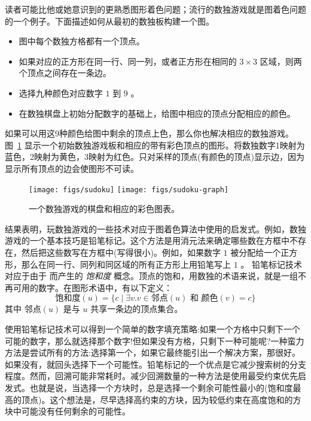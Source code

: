 \documentclass[11pt]{book}
\begin{document}
读者可能比他或她意识到的更熟悉图形着色问题；流行的数独游戏就是图着色问题的一个例子。下面描述如何从最初的数独板构建一个图。
\begin{itemize}
\item 图中每个数独方格都有一个顶点。
\item 如果对应的正方形在同一行、同一列，或者正方形在相同的 $3\times 3$ 区域，则两个顶点之间存在一条边。
\item 选择九种颜色对应数字 $1$ 到 $9$ 。
\item 在数独棋盘上初始分配数字的基础上，给图中相应的顶点分配相应的颜色。
\end{itemize}
如果可以用这9种颜色给图中剩余的顶点上色，那么你也解决相应的数独游戏。
图~\ref{fig:sudoku-graph} 显示一个初始数独游戏板和相应的带有彩色顶点的图形。将数独数字1映射为蓝色，2映射为黄色，3映射为红色。只对采样的顶点(有颜色的顶点)显示边，因为显示所有顶点的边会使图形不可读。

\begin{figure}[tbp]
\texttt{[image: figs/sudoku]}
\texttt{[image: figs/sudoku-graph]}
\caption{一个数独游戏的棋盘和相应的彩色图表。}
\label{fig:sudoku-graph}
\end{figure}

结果表明，玩数独游戏的一些技术对应于图着色算法中使用的启发式。例如，数独游戏的一个基本技巧是铅笔标记。这个方法是用消元法来确定哪些数在方框中不存在，然后把这些数写在方框中(写得很小)。例如，如果数字 $1$ 被分配给一个正方形，那么在同一行、同列和同区域的所有正方形上用铅笔写上 $1$ 。
%
铅笔标记技术对应于由于 \cite{Brelaz:1979eu} 而产生的
\emph{饱和度} 概念。顶点的饱和，用数独的术语来说，就是一组不再可用的数字。在图形术语中，有以下定义：
\begin{equation*}
  \mathrm{饱和度}(u) = \{ c \;|\; \exists v. v \in \mathrm{邻点}(u)
     \text{ 和 } \mathrm{颜色}(v) = c \}
\end{equation*}
其中 $\mathrm{邻点}(u)$ 是与 $u$ 共享一条边的顶点集合。

使用铅笔标记技术可以得到一个简单的数字填充策略:如果一个方格中只剩下一个可能的数字，那么就选择那个数字!但如果没有方格，只剩下一种可能呢?一种蛮力方法是尝试所有的方法:选择第一个，如果它最终能引出一个解决方案，那很好。如果没有，就回头选择下一个可能性。铅笔标记的一个优点是它减少搜索树的分支程度。然而，回溯可能非常耗时。减少回溯数量的一种方法是使用最受约束优先启发式。也就是说，当选择一个方块时，总是选择一个剩余可能性最小的(饱和度最高的顶点)。这个想法是，尽早选择高约束的方块，因为较低约束在高度饱和的方块中可能没有任何剩余的可能性。
\end{document}
